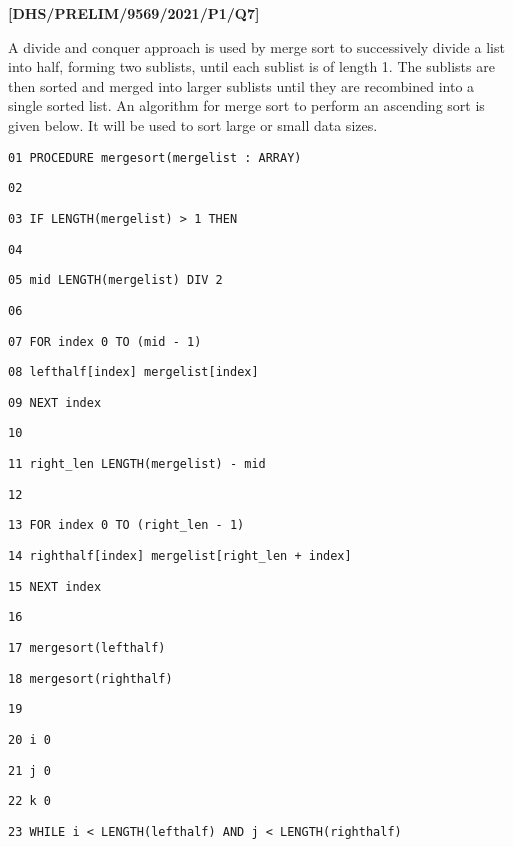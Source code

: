 \item \textbf{{[}DHS/PRELIM/9569/2021/P1/Q7{]} }

A divide and conquer approach is used by merge sort to successively
divide a list into half, forming two sublists, until each sublist
is of length 1. The sublists are then sorted and merged into larger
sublists until they are recombined into a single sorted list. An algorithm
for merge sort to perform an ascending sort is given below. It will
be used to sort large or small data sizes. 

\noindent %
\noindent\begin{minipage}[t]{1\columnwidth}%
\texttt{01 PROCEDURE mergesort(mergelist : ARRAY) }

\texttt{02}

\texttt{03 \qquad{}IF LENGTH(mergelist) > 1 THEN }

\texttt{04 }

\texttt{05 \qquad{}\qquad{}mid \textleftarrow{} LENGTH(mergelist)
DIV 2 }

\texttt{06 }

\texttt{07 \qquad{}\qquad{}FOR index \textleftarrow{} 0 TO (mid
- 1) }

\texttt{08 \qquad{}\qquad{}\qquad{}lefthalf{[}index{]} \textleftarrow{}
mergelist{[}index{]} }

\texttt{09 \qquad{}\qquad{}NEXT index}

\texttt{10}

\texttt{11 \qquad{}\qquad{}right\_len \textleftarrow{} LENGTH(mergelist)
- mid}

\texttt{12}

\texttt{13 \qquad{}\qquad{}FOR index \textleftarrow{} 0 TO (right\_len
- 1) }

\texttt{14 \qquad{}\qquad{}\qquad{}righthalf{[}index{]} \textleftarrow{}
mergelist{[}right\_len + index{]} }

\texttt{15 \qquad{}\qquad{}NEXT index }

\texttt{16}

\texttt{17 \qquad{}\qquad{}mergesort(lefthalf) }

\texttt{18 \qquad{}\qquad{}mergesort(righthalf) }

\texttt{19}

\texttt{20 \qquad{}\qquad{}i \textleftarrow{} 0 }

\texttt{21 \qquad{}\qquad{}j \textleftarrow{} 0 }

\texttt{22 \qquad{}\qquad{}k \textleftarrow{} 0 }

\texttt{23 \qquad{}\qquad{}WHILE i < LENGTH(lefthalf) AND j < LENGTH(righthalf) }


\end{minipage}
